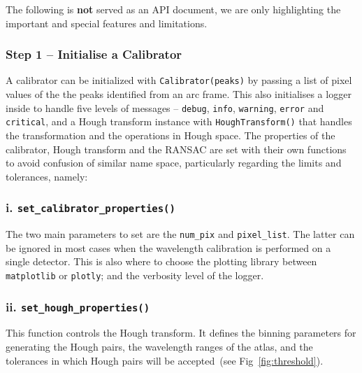 \documentclass{aa}
\begin{document}
The following is \textbf{not} served as an API document, we are only highlighting
the important and special features and limitations.

\subsubsection*{Step 1 -- Initialise a Calibrator}
A calibrator can be initialized with \texttt{Calibrator(peaks)} by passing a list
of pixel values of the the peaks identified from an arc frame. This also
initialises a logger inside to handle five levels of messages -- \texttt{debug},
\texttt{info}, \texttt{warning}, \texttt{error} and \texttt{critical}, and a
Hough transform instance with \texttt{HoughTransform()} that handles the
transformation and the operations in Hough space. The properties of the
calibrator, Hough transform and the RANSAC are set with their own functions to
avoid confusion of similar name space, particularly regarding the limits and
tolerances, namely:

\subsubsection*{i. \texttt{set\_calibrator\_properties()}}
The two main parameters to set are the \texttt{num\_pix} and \texttt{pixel\_list}.
The latter can be ignored in most cases when the wavelength calibration is performed
on a single detector. This is also where to choose the plotting library between
\texttt{matplotlib} or \texttt{plotly}; and the verbosity level of the logger.

\subsubsection*{ii. \texttt{set\_hough\_properties()}}
This function controls the Hough transform. It defines the binning parameters for
generating the Hough pairs, the wavelength ranges of the atlas, and the tolerances
in which Hough pairs will be accepted~(see Fig~\ref{fig:threshold}).
\end{document}
